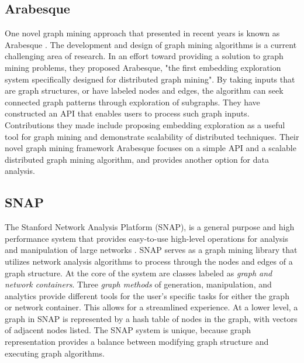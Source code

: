 \documentclass[letterpaper, 10 pt, conference]{ieeeconf}
\begin{document}
\subsection{Arabesque}
One novel graph mining approach that presented in recent years is known as Arabesque \cite{c2}. The development and design of graph mining algorithms is a current challenging area of research. In an effort toward providing a solution to graph mining problems, they proposed Arabesque, "the first embedding exploration system specifically designed for distributed graph mining". By taking inputs that are graph structures, or have labeled nodes and edges, the algorithm can seek connected graph patterns through exploration of subgraphs. They have constructed an API that enables users to process such graph inputs. Contributions they made include proposing embedding exploration as a useful tool for graph mining and demonstrate scalability of distributed techniques. Their novel graph mining framework Arabesque focuses on a simple API and a scalable distributed graph mining algorithm, and provides another option for data analysis. 

\hfill
\subsection{SNAP}
The Stanford Network Analysis Platform (SNAP), is a general purpose and high performance system that provides easy-to-use high-level operations for analysis and manipulation of large networks \cite{c3}. SNAP serves as a graph mining library that utilizes network analysis algorithms to process through the nodes and edges of a graph structure. At the core of the system are classes labeled as \emph{graph and network containers}. Three \emph{graph methods} of generation, manipulation, and analytics provide different tools for the user's specific tasks for either the graph or network container. This allows for a streamlined experience. At a lower level, a graph in SNAP is represented by a hash table of nodes in the graph, with vectors of adjacent nodes listed. The SNAP system is unique, because graph representation provides a balance between modifying graph structure and executing graph algorithms.

\hfill
\end{document}
